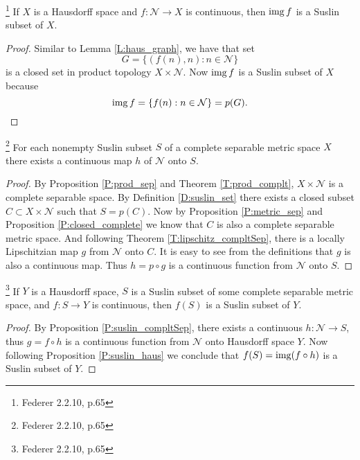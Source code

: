 \begin{proposition} \label{P:suslin_haus}
  \footnote{Federer 2.2.10, p.65}
	If $X$ is a Hausdorff space and $f:\mathcal{N}\to X$ is continuous, then
	$\operatorname*{img} f$ is a Suslin subset of $X$.
\end{proposition}
\begin{proof}
Similar to Lemma \ref{L:haus_graph}, we have that set
\[
	G = \{ (f(n),n): n\in\mathcal{N} \}
\]
is a closed set in product topology $X\times \mathcal{N}$. Now $\operatorname*{img} f$ is a
Suslin subset of $X$ because
\[
	\operatorname*{img} f = \{ f(n): n\in \mathcal{N} \} = p(G).
\]
\end{proof}


\begin{proposition} \label{P:suslin_compltSep}
  \footnote{Federer 2.2.10, p.65}
	For each nonempty Suslin subset $S$ of a complete separable metric space $X$
	there exists a continuous map $h$ of $\mathcal{N}$ onto $S$.
\end{proposition}
\begin{proof}
By Proposition \ref{P:prod_sep} and Theorem \ref{T:prod_complt}, 
$X \times\mathcal{N}$ is a complete separable space. By Definition
\ref{D:suslin_set} there exists a closed subset $C\subset X\times \mathcal{N}$
such that $S=p(C)$. Now by Proposition \ref{P:metric_sep} and Proposition
\ref{P:closed_complete} we know that $C$ is also a complete separable metric
space. And following Theorem \ref{T:lipschitz_compltSep}, there is a locally
Lipschitzian map $g$ from $\mathcal{N}$ onto $C$. It is easy to see from the
definitions that $g$ is also a continuous map. Thus $h=p\circ g$ is a continuous
function from $\mathcal{N}$ onto $S$.
\end{proof}

\begin{corollary}
  \footnote{Federer 2.2.10, p.65}
	If $Y$ is a Hausdorff space, $S$ is a Suslin subset of some complete separable 
	metric space, and $f:S\to Y$ is continuous, then $f(S)$ is a Suslin subset of
	$Y$.
\end{corollary}
\begin{proof}
	By Proposition \ref{P:suslin_compltSep}, there exists a continuous
	$h:\mathcal{N}\to S$, thus $g=f\circ h$ is a continuous function from
	$\mathcal{N}$ onto Hausdorff space $Y$. Now following Proposition
	\ref{P:suslin_haus} we conclude that $f(S)=\operatorname*{img} (f\circ h)$ is a Suslin subset
	of $Y$.
\end{proof}

